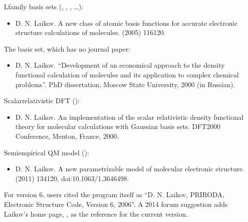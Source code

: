 \documentclass[letterpaper,10pt,english,openany,oneside]{sphinxmanual}
\begin{document}
\sphinxAtStartPar
L\sphinxhyphen{}family basis sets (, , , …):
\begin{itemize}
\item {} 
\sphinxAtStartPar
D. N. Laikov. A new class of atomic basis functions for accurate electronic structure calculations of molecules.
  (2005) 116\textendash{}120. 

\end{itemize}

\sphinxAtStartPar
The  basis set, which has no journal paper:
\begin{itemize}
\item {} 
\sphinxAtStartPar
D. N. Laikov. “Development of an economical approach to the density functional calculation of molecules and its
application to complex chemical problems”. PhD dissertation, Moscow State University, 2000 (in Russian).



\end{itemize}

\sphinxAtStartPar
Scalar\sphinxhyphen{}relativistic DFT ():
\begin{itemize}
\item {} 
\sphinxAtStartPar
D. N. Laikov. An implementation of the scalar relativistic density functional theory for molecular calculations
with Gaussian basis sets. DFT2000 Conference, Menton, France, 2000. 

\end{itemize}

\sphinxAtStartPar
Semiempirical QM model ():
\begin{itemize}
\item {} 
\sphinxAtStartPar
D. N. Laikov. A new parametrizable model of molecular electronic structure.   (2011) 134120,
doi:10.1063/1.3646498. 

\end{itemize}

\sphinxAtStartPar
For version 6, users cited the program itself as “D. N. Laikov, PRIRODA, Electronic Structure Code, Version 6, 2006”.
A 2014 forum suggestion adds Laikov’s home page, , as the reference for the current
version.
\end{document}
